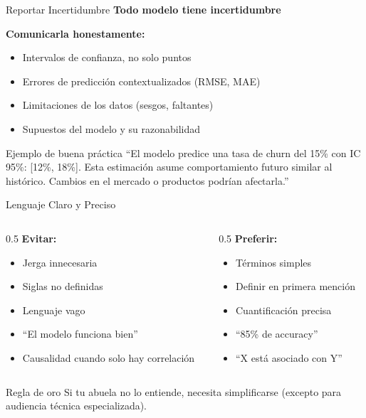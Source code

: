 \documentclass[aspectratio=169]{beamer}
\begin{document}
\begin{frame}{Reportar Incertidumbre}
\textbf{Todo modelo tiene incertidumbre}

\vspace{0.3cm}

\textbf{Comunicarla honestamente:}
\begin{itemize}
\item Intervalos de confianza, no solo puntos
\item Errores de predicción contextualizados (RMSE, MAE)
\item Limitaciones de los datos (sesgos, faltantes)
\item Supuestos del modelo y su razonabilidad
\end{itemize}

\vspace{0.3cm}

\begin{exampleblock}{Ejemplo de buena práctica}
``El modelo predice una tasa de churn del 15\% con IC 95\%: [12\%, 18\%]. Esta estimación asume comportamiento futuro similar al histórico. Cambios en el mercado o productos podrían afectarla.''
\end{exampleblock}
\end{frame}

\begin{frame}{Lenguaje Claro y Preciso}
\begin{columns}
\begin{column}{0.5\textwidth}
\textbf{Evitar:}
\begin{itemize}
\item Jerga innecesaria
\item Siglas no definidas
\item Lenguaje vago
\item ``El modelo funciona bien''
\item Causalidad cuando solo hay correlación
\end{itemize}
\end{column}

\begin{column}{0.5\textwidth}
\textbf{Preferir:}
\begin{itemize}
\item Términos simples
\item Definir en primera mención
\item Cuantificación precisa
\item ``85\% de accuracy''
\item ``X está asociado con Y''
\end{itemize}
\end{column}
\end{columns}

\vspace{0.4cm}

\begin{alertblock}{Regla de oro}
Si tu abuela no lo entiende, necesita simplificarse (excepto para audiencia técnica especializada).
\end{alertblock}
\end{frame}
\end{document}
